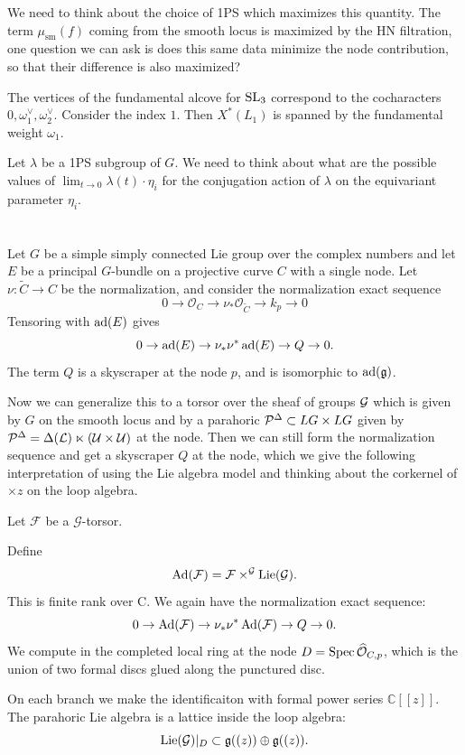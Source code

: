 \documentclass[12pt]{article}
\begin{document}
We need to think about the choice of 1PS which maximizes this quantity. The term $\mu_{\mathrm{sm}}(f)$ coming from the smooth locus is maximized by the HN filtration, one question we can ask is does this same data minimize the node contribution, so that their difference is also maximized?


The vertices of the fundamental alcove for $\operatorname{SL}_3$ correspond to the cocharacters $0, \omega_1^\vee, \omega_2^\vee.$ Consider the index ${1}$. Then $X^*(L_{1})$ is spanned by the fundamental weight $\omega_1$. 

Let $\lambda$ be a 1PS subgroup of $G$. We need to think about what are the possible values of $\lim_{t\to 0} \lambda(t) \cdot \eta_i$ for the conjugation action of $\lambda$ on the equivariant parameter $\eta_i$. 


\section{}
Let $G$ be a simple simply connected Lie group over the complex numbers and let $E$ be a principal $G$-bundle on a projective curve $C$ with a single node. Let $\nu:\widetilde C\to C$ be the normalization, and consider the normalization exact sequence
\[
0\to \mathcal{O}_C\to \nu_*\mathcal{O}_{\widetilde C}\to k_p\to 0
\]
Tensoring with $\operatorname{ad}(E)$ gives
\[0\to \operatorname{ad}(E)\to \nu_*\nu^*\operatorname{ad}(E)\to Q\to 0.\]
The term $Q$ is a skyscraper at the node $p$, and is isomorphic to $\operatorname{ad}(\mathfrak{g})$.

Now we can generalize this to a torsor over the sheaf of groups ${\mathcal{G}}$ which is given by $G$ on the smooth locus and by a parahoric ${\mathcal{P}}^{\Delta} \subset LG \times LG$ given by ${\mathcal{P}}^{\Delta} = \Delta({\mathcal{L}}) \ltimes ({\mathcal{U}} \times {\mathcal{U}})$ at the node. Then we can still form the normalization sequence and get a skyscraper $Q$ at the node, which we give the following interpretation of using the Lie algebra model and thinking about the corkernel of $\times z$ on the loop algebra.

Let $\mathcal F$ be a $\mathcal G$-torsor.

Define
\[
\operatorname{Ad}(\mathcal F)=\mathcal F \times^{\mathcal G} \operatorname{Lie}(\mathcal G).
\]
This is finite rank over C. We again have the normalization exact sequence:
\[
0 \to \operatorname{Ad}(\mathcal F)
\to \nu_* \nu^*\operatorname{Ad}(\mathcal F)
\to Q \to 0.
\]
We compute in the completed local ring at the node $D = \operatorname{Spec} \widehat{\mathcal{O}}_{C,p}$, which is the union of two formal discs glued along the punctured disc.

On each branch we make the identificaiton with formal power series $\mathbb{C}[[z]]$. The parahoric Lie algebra is a lattice inside the loop algebra:
\[
\operatorname{Lie}(\mathcal{G})|_D \subset \mathfrak{g}((z))\oplus \mathfrak{g}((z)).
\] 
\end{document}
